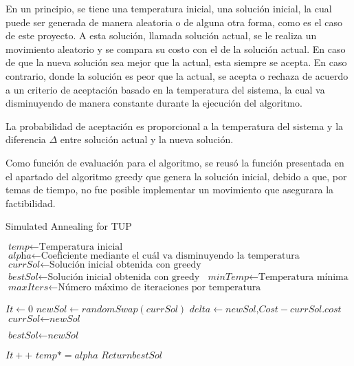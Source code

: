 \documentclass[letter, 10pt]{article}
\begin{document}
En un principio, se tiene una temperatura inicial, una soluci\'on inicial, la cual puede ser generada de manera aleatoria o de alguna otra forma, como es el caso de este proyecto. A esta soluci\'on, llamada soluci\'on actual, se le realiza un movimiento aleatorio y se compara su costo con el de la soluci\'on actual. En caso de que la nueva soluci\'on sea mejor que la actual, esta siempre se acepta. En caso contrario, donde la soluci\'on es peor que la actual, se acepta o rechaza de acuerdo a un criterio de aceptaci\'on basado en la temperatura del sistema, la cual va disminuyendo de manera constante durante la ejecuci\'on del algoritmo.

La probabilidad de aceptaci\'on es proporcional a la temperatura del sistema y la diferencia $\Delta$ entre soluci\'on actual y la nueva soluci\'on.

Como funci\'on de evaluaci\'on para el algoritmo, se reus\'o la funci\'on presentada en el apartado del algoritmo greedy que genera la soluci\'on inicial, debido a que, por temas de tiempo, no fue posible implementar un movimiento que asegurara la factibilidad.


\begin{algorithm}[H]
  \caption{Simulated Annealing for TUP}\label{SATUP}
  \begin{algorithmic}[1]
    \State $\textit{temp} \gets \text{Temperatura inicial}$
    \State $\textit{alpha} \gets \text{Coeficiente mediante el cu\'al va disminuyendo la temperatura}$
    \State $\textit{currSol} \gets \text{Soluci\'on inicial obtenida con greedy}$
    \State $\textit{bestSol} \gets \text{Soluci\'on inicial obtenida con greedy}$
    \State $\textit{minTemp} \gets \text{Temperatura m\'inima}$
    \State $\textit{maxIters} \gets \text{N\'umero m\'aximo de iteraciones por temperatura}$

    \State $\textit{It} \gets 0$
    \State $\textit{newSol} \gets randomSwap(\textit{currSol})$
    \State $\textit{delta} \gets \textit{newSol,Cost} - \textit{currSol.cost}$
    \State $\textit{currSol} \gets \textit{newSol}$
    \EndIf


    \State $\textit{bestSol} \gets \textit{newSol}$
    \EndIf

    \State $It++$
    \EndWhile
    \State $temp *= alpha$
    \EndWhile
    \State $Return \textit{bestSol}$
    \EndProcedure
  \end{algorithmic}
\end{algorithm}
\end{document}
